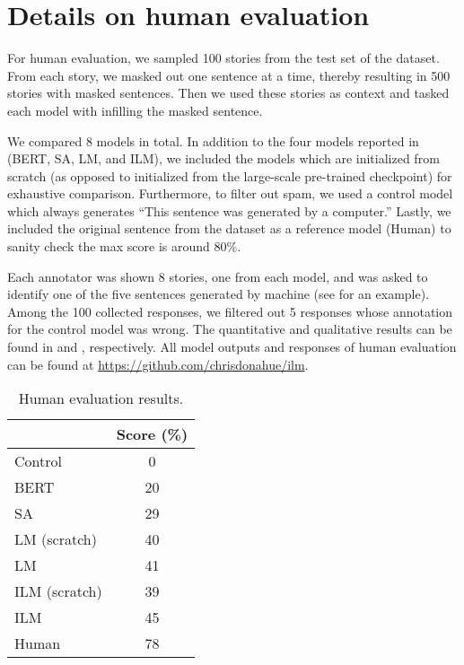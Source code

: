 \section{Details on human evaluation}\label{sec:human_eval_details}\label{sec:more_examples}

For human evaluation, we sampled 100 stories from the test set of the \stories{} dataset. 
From each story, we masked out one sentence at a time, thereby resulting in 500 stories with masked sentences. 
Then we used these stories as context and tasked each model with infilling the masked sentence. 

We compared 8 models in total. 
In addition to the four models reported in  (BERT, SA, LM, and ILM), we included the models which are initialized from scratch (as opposed to initialized from the large-scale pre-trained checkpoint) for exhaustive comparison.
Furthermore, to filter out spam, we used a control model which always generates ``This sentence was generated by a computer.''
Lastly, we included the original sentence from the dataset as a reference model (Human) to sanity check the max score is around 80\%.

Each annotator was shown 8 stories, one from each model, and was asked to identify one of the five sentences generated by machine (see  for an example). 
Among the 100 collected responses, we filtered out 5 responses whose annotation for the control model was wrong. 
The quantitative and qualitative results can be found in  and , respectively.
All model outputs and responses of human evaluation can be found at \url{https://github.com/chrisdonahue/ilm}.


\begin{table}[ht]
    \centering
    \begin{tabular}[h]{lc}
        \toprule
         & Score (\%) \\
        \midrule
        Control & 0 \\
        BERT & 20 \\
        SA & 29 \\
        LM (scratch) & 40 \\
        LM & 41 \\
        ILM (scratch) & 39 \\
        ILM & 45 \\
        Human & 78 \\
        \bottomrule
    \end{tabular}
    \caption{Human evaluation results.}\label{tab:human_eval_all}
\end{table}

